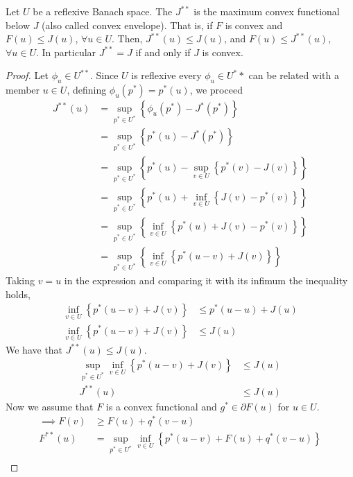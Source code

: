 \begin{theorem}
	Let $U$ be a reflexive Banach space. The $J^{**}$ is the maximum convex functional below $J$ (also called convex envelope). That is, if $F$ is convex and $F(u)\leq J(u)$, $\forall u \in U$. Then, $J^{**}(u)\leq J(u)$, and $F(u)\leq J^{**}(u)$, $\forall u \in U$. In particular $J^{**}=J$ if and only if $J$ is convex.
	\begin{proof}
		Let $\phi_u \in U^{**}$. Since $U$ is reflexive every $\phi_u \in U^**$ can be related with a member $u \in U$, defining $\phi_u(p^*)=p^*(u)$, we proceed 
		\begin{align*}
			J^{**}(u)&=\sup_{p^*\in U^*} \left\lbrace \phi_u(p^*)-J^*(p^*) \right\rbrace\\
					&=\sup_{p^*\in U^*} \left\lbrace p^*(u)-J^*(p^*) \right\rbrace\\
					&=\sup_{p^*\in U^*} \left\lbrace p^*(u)-\sup_{v\in U}\left\lbrace p^*(v)-J(v)\right\rbrace\right\rbrace\\
					&=\sup_{p^*\in U^*} \left\lbrace p^*(u)+\inf_{v\in U}\left\lbrace J(v)-p^*(v)\right\rbrace\right\rbrace\\
					&=\sup_{p^*\in U^*} \left\lbrace \inf_{v\in U}\left\lbrace p^*(u)+ J(v)-p^*(v)\right\rbrace\right\rbrace\\
					&=\sup_{p^*\in U^*} \left\lbrace \inf_{v\in U}\left\lbrace p^*(u-v)+J(v)\right\rbrace\right\rbrace
		\end{align*}
		Taking $v=u$ in the expression and comparing it with its infimum the inequality holds,
			\begin{align*}
				\inf_{v\in U}\left\lbrace p^* \left(u-v\right)+J(v) \right\rbrace &\leq p^*(u-u)+J(u) \\
				\inf_{v\in U}\left\lbrace p^* \left(u-v\right)+J(v) \right\rbrace &\leq J(u)
			\end{align*}
		We have that $J^{**}(u)\leq J(u)$.
		\begin{align*}
		\sup_{p^* \in U^*}\inf_{v\in U}\left\lbrace p^* \left(u-v\right)+J(v) \right\rbrace &\leq J(u)\\
		J^{**}(u) &\leq J(u)
		\end{align*}
		Now we assume that $F$ is a convex functional and $g^* \in \partial F(u)$ for $u \in U$.
		\begin{align*}
			\implies  F(v)&\geq F(u)+q^*(v-u)\\
					  F^{**}(u)& = \sup_{p^* \in U^*} \inf_{v \in U} \left\lbrace p^*(u-v)+F(u)+q^*(v-u)\right\rbrace \\

\end{align*}
\end{proof}
\end{theorem}
